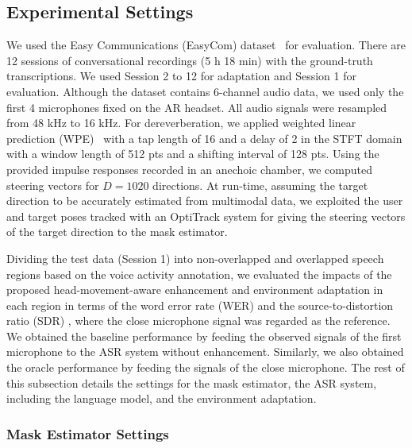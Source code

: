 \documentclass[a4paper]{article}
\begin{document}
\subsection{Experimental Settings} \label{sec:exp_settings}

We used the Easy Communications (EasyCom) dataset~\cite{donley2021easycom} for evaluation.
There are 12 sessions of conversational recordings (5 h 18 min)
 with the ground-truth transcriptions.
We used Session 2 to 12 for adaptation 
 and Session 1 for evaluation.
Although the dataset contains 6-channel audio data,
 we used only the first 4 microphones fixed on the AR headset.
All audio signals were resampled from 48 kHz to 16 kHz.
For dereverberation,
 we applied weighted linear prediction (WPE)~\cite{yoshioka_generalization_2012} 
 with a tap length of 16 and a delay of 2 in the STFT domain with a window length of 512 pts and a shifting interval of 128 pts.
Using the provided impulse responses recorded in an anechoic chamber,
 we computed steering vectors for $D \!=\! 1020$ directions. 
At run-time, assuming the target direction to be accurately estimated from multimodal data,
 we exploited the user and target poses tracked with an OptiTrack system
 for giving the steering vectors of the target direction
 to the mask estimator.

Dividing the test data (Session 1) into non-overlapped and overlapped speech regions
 based on the voice activity annotation,
 we evaluated the impacts of the proposed head-movement-aware enhancement and environment adaptation
 in each region in terms of
 the word error rate (WER) and
 the source-to-distortion ratio (SDR) \cite{vincent_performance_2006},
 where the close microphone signal was regarded as the reference.
We obtained the baseline performance 
 by feeding the observed signals of the first microphone to the ASR system without enhancement.
Similarly, we also obtained the oracle performance 
 by feeding the signals of the close microphone.
The rest of this subsection details the settings for the mask estimator, 
 the ASR system, including the language model, and the environment adaptation.

\subsubsection{Mask Estimator Settings} \label{sec:mask_system}
\end{document}
